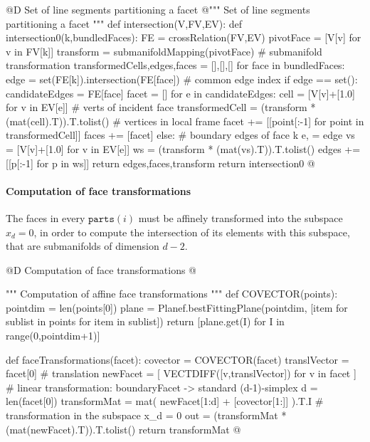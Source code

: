 \documentclass[11pt,oneside]{article}    %
\begin{document}
@D Set of line segments partitioning a facet
@{""" Set of line segments partitioning a facet """
def intersection(V,FV,EV):
    def intersection0(k,bundledFaces):
        FE = crossRelation(FV,EV)
        pivotFace = [V[v] for v in FV[k]]
        transform = submanifoldMapping(pivotFace)  # submanifold transformation
        transformedCells,edges,faces = [],[],[]
        for face in bundledFaces:
            edge = set(FE[k]).intersection(FE[face])  # common edge index
            if edge == set():
                candidateEdges = FE[face]
                facet = []
                for e in candidateEdges:
                    cell = [V[v]+[1.0] for v in EV[e]]  # verts of incident face
                    transformedCell = (transform * (mat(cell).T)).T.tolist()  
                    # vertices in local frame
                    facet += [[point[:-1] for point in transformedCell]]
                faces += [facet]
            else:  # boundary edges of face k
                e, = edge
                vs = [V[v]+[1.0] for v in EV[e]]
                ws = (transform * (mat(vs).T)).T.tolist()
                edges += [[p[:-1] for p in ws]]
        return edges,faces,transform
    return intersection0    
@}



\paragraph{Computation of face transformations}
The faces in every $\texttt{parts}(i)$ must be affinely transformed into the subspace $x_d=0$, in order to compute the intersection of its elements with this subspace, that are submanifolds of dimension $d-2$.

@D Computation of face transformations
@{""" Computation of affine face transformations """
def COVECTOR(points):
    pointdim = len(points[0])
    plane = Planef.bestFittingPlane(pointdim,
                    [item for sublist in points for item in sublist])
    return [plane.get(I) for I in range(0,pointdim+1)]

def faceTransformations(facet):
    covector = COVECTOR(facet)
    translVector = facet[0]
    # translation 
    newFacet = [ VECTDIFF([v,translVector]) for v in facet ]
    # linear transformation: boundaryFacet -> standard (d-1)-simplex
    d = len(facet[0])
    transformMat = mat( newFacet[1:d] + [covector[1:]] ).T.I
    # transformation in the subspace x_d = 0
    out = (transformMat * (mat(newFacet).T)).T.tolist()
    return transformMat
@}
    
\end{document}
